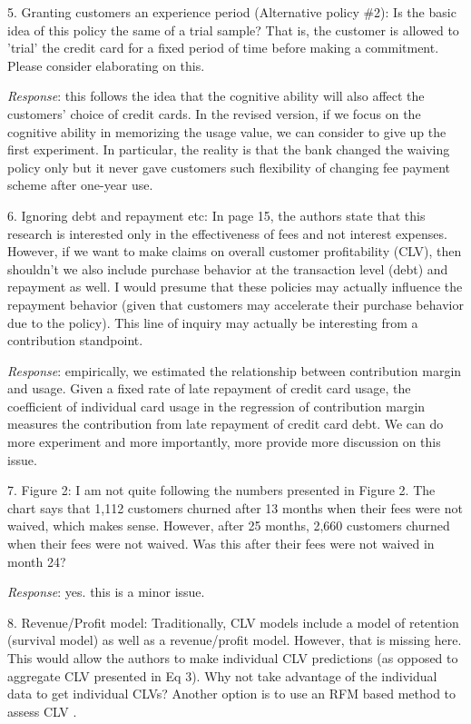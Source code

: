 \documentclass[titlepage,12pt,letterpaper]{article}
\numberwithin{equation}{section}
\begin{document}
5.	Granting customers an experience period (Alternative policy \#2): Is the basic idea of this policy the same of a trial sample? That is, the customer is allowed to 'trial' the credit card for a fixed period of time before making a commitment. Please consider elaborating on this.

\emph{Response}: this follows the idea that the cognitive ability will also affect the customers' choice of credit cards. In the revised version, if we focus on the cognitive ability in memorizing the usage value, we can consider to give up the first experiment. In particular, the reality is that the bank changed the waiving policy only but it never gave customers such flexibility of changing fee payment scheme after one-year use. 

6.	Ignoring debt and repayment etc: In page 15, the authors state that this research is interested only in the effectiveness of fees and not interest expenses. However, if we want to make claims on overall customer profitability (CLV), then shouldn't we also include purchase behavior at the transaction level (debt) and repayment as well. I would presume that these policies may actually influence the repayment behavior (given that customers may accelerate their purchase behavior due to the policy). This line of inquiry may actually be interesting from a contribution standpoint.

\emph{Response}: empirically, we estimated the relationship between contribution margin and usage. Given a fixed rate of late repayment of credit card usage, the coefficient of individual card usage in the regression of contribution margin measures the contribution from late repayment of credit card debt. We can do more experiment and more importantly, more provide more discussion on this issue. 

7.	Figure 2: I am not quite following the numbers presented in Figure 2. The chart says that 1,112 customers churned after 13 months when their fees were not waived, which makes sense. However, after 25 months, 2,660 customers churned when their fees were not waived. Was this after their fees were not waived in month 24?

\emph{Response}: yes. this is a minor issue. 

8.	Revenue/Profit model: Traditionally, CLV models include a model of retention (survival model) as well as a revenue/profit model. However, that is missing here. This would allow the authors to make individual CLV predictions (as opposed to aggregate CLV presented in Eq 3). Why not take advantage of the individual data to get individual CLVs? Another option is to use an RFM based method to assess CLV \citep[for e.g.,][]{Fader2005,Reinartz2000}.
\end{document}
